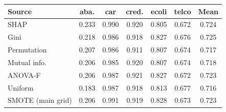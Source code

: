 \begin{tabular}{@{}lcccccc@{}}
\toprule
Source & aba. & car & cred. & ecoli & telco & Mean \\
\midrule
SHAP & 0.233 & 0.990 & 0.920 & 0.805 & 0.672 & 0.724 \\
Gini & 0.218 & 0.986 & 0.918 & 0.827 & 0.676 & 0.725 \\
Permutation & 0.207 & 0.986 & 0.911 & 0.807 & 0.674 & 0.717 \\
Mutual info. & 0.206 & 0.985 & 0.920 & 0.807 & 0.674 & 0.718 \\
ANOVA-F & 0.206 & 0.987 & 0.921 & 0.827 & 0.672 & 0.723 \\
Uniform & 0.183 & 0.987 & 0.918 & 0.813 & 0.677 & 0.716 \\
\midrule
SMOTE (main grid) & 0.206 & 0.991 & 0.919 & 0.828 & 0.673 & 0.723 \\
\bottomrule
\end{tabular}
